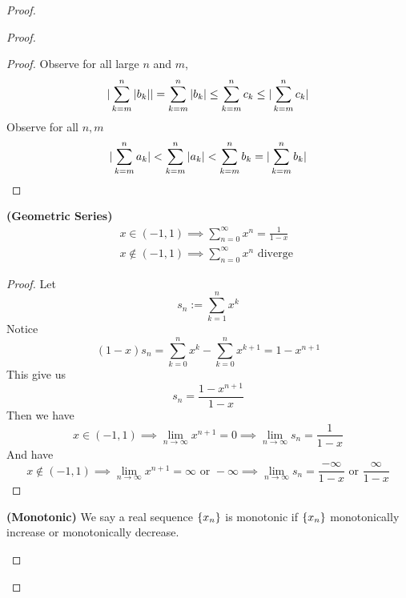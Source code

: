 \documentclass{report}
\begin{document}
\begin{proof}
\begin{proof}
\begin{theorem}
\end{theorem}
\begin{proof}
Observe for all large $n$ and $m$,
\begin{equation}
|\sum_{k=m}^n |b_k||=\sum_{k=m}^n |b_k|\leq \sum_{k=m}^n c_k\leq |\sum_{k=m}^n c_k|
\end{equation}
Observe for all $n,m$
\begin{equation}
|\sum_{k=m}^n a_k|<\sum_{k=m}^n |a_k|<\sum_{k=m}^n b_k=|\sum_{k=m}^n b_k|
\end{equation}
\end{proof}
\begin{theorem}
\label{4.2.8}
\textbf{(Geometric Series)} 
\begin{align}
x\in (-1,1)\implies \sum_{n=0}^\infty x^n=\frac{1}{1-x}\\
x\not\in (-1,1)\implies \sum_{n=0}^\infty x^n\text{ diverge }
\end{align}
\end{theorem}
\begin{proof}
Let 
\begin{equation}
s_n:=\sum_{k=1}^n x^k
\end{equation}
Notice
\begin{equation}
  (1-x)s_n=\sum_{k=0}^n x^k-\sum_{k=0}^n x^{k+1}=1-x^{n+1}
\end{equation}
This give us
\begin{equation}
s_n=\frac{1-x^{n+1}}{1-x}
\end{equation}
Then we have
\begin{equation}
x\in (-1,1)\implies \lim_{n\to\infty}x^{n+1}=0\implies \lim_{n\to\infty}s_n=\frac{1}{1-x}
\end{equation}
And have
\begin{equation}
x\not\in (-1,1)\implies \lim_{n\to\infty}x^{n+1}=\infty\text{ or }-\infty\implies \lim_{n\to\infty}s_n= \frac{-\infty}{1-x}\text{ or }\frac{\infty}{1-x}
\end{equation}
\end{proof}
\begin{definition}
\label{4.2.9}
\textbf{(Monotonic)} We say a real sequence $\{ x_n \}$ is monotonic if $\{ x_n \}$ monotonically increase or monotonically decrease.

\end{definition}
\end{proof}
\end{proof}
\end{document}
